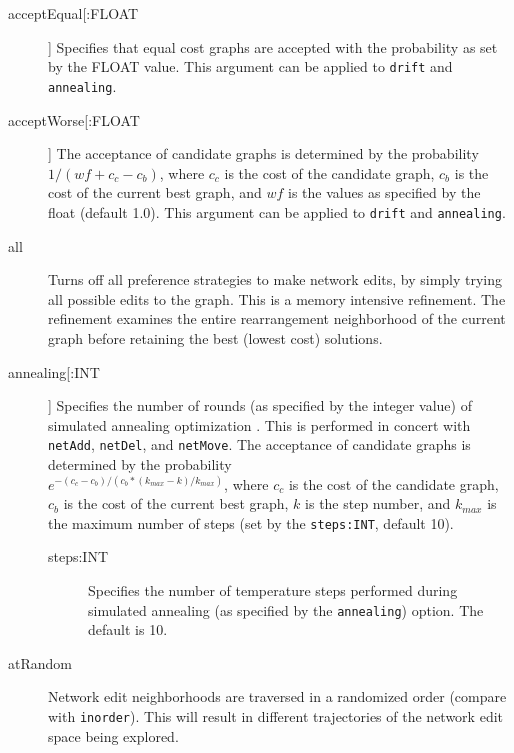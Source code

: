 	\begin{description}
		\item[acceptEqual[:FLOAT]] Specifies that equal cost graphs are accepted with the
		probability as set by the FLOAT value. This argument can be applied to \texttt{drift}
		and \texttt{annealing}.
			
		\item[acceptWorse[:FLOAT]] The acceptance of candidate graphs is determined by the 
		probability $1/ (wf + c_c - c_b)$, where $c_c$ is the cost of the candidate graph, $c_b$ 
		is the cost of the current best graph, and $wf$ is the values as specified by the float 
		(default 1.0). This argument can be applied to \texttt{drift} 	and \texttt{annealing}.
	
		\item[all] Turns off all preference strategies to make network edits, by simply trying 
		all possible edits to the graph. This is a memory intensive refinement.
		The refinement examines the entire rearrangement neighborhood of the current graph 
		before retaining the best (lowest cost) solutions.

		\item[annealing[:INT]] Specifies the number of rounds (as specified by the integer 
		value) of simulated annealing optimization \citep{Metropolisetal1953, 
		Kirkpatricketal1983, Cerny1985}. This is performed in concert with \texttt{netAdd}, 
		\texttt{netDel}, and \texttt{netMove}. The acceptance of candidate graphs is 
		determined by the probability\\ $e ^ {- (c_c - c_b)/ (c_b * (k_{max} -k)/ k_{max})}$, 
		where $c_c$ is the cost of the candidate graph, $c_b$ is the cost of the current 
		best graph, $k$ is the step number, and $k_{max}$ is the maximum number of 
		steps (set by the \texttt{steps:INT}, default 10).

			\begin{description}
			\item[steps:INT] Specifies the number of temperature steps performed 
			during simulated annealing (as specified by the \texttt{annealing}) option.
			The default is 10.
			\end{description}
			
		\item[atRandom] Network edit neighborhoods are traversed in a randomized order (compare 
		with \texttt{inorder}). 	This will result in different trajectories of the network edit space being 
		explored.


\end{description}
